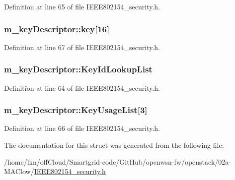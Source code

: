 Definition at line 65 of file I\+E\+E\+E802154\+\_\+security.\+h.

\subsubsection[{\texorpdfstring{key}{key}}]{ m\+\_\+key\+Descriptor\+::key\mbox{[}16\mbox{]}}\hypertarget{structm__key_descriptor_a858158ce9fb438694b20903224536e9c}{}\label{structm__key_descriptor_a858158ce9fb438694b20903224536e9c}


Definition at line 67 of file I\+E\+E\+E802154\+\_\+security.\+h.

\subsubsection[{\texorpdfstring{Key\+Id\+Lookup\+List}{KeyIdLookupList}}]{ m\+\_\+key\+Descriptor\+::\+Key\+Id\+Lookup\+List}\hypertarget{structm__key_descriptor_ad637ea689a0a3d949ee8d5d7a5210ddd}{}\label{structm__key_descriptor_ad637ea689a0a3d949ee8d5d7a5210ddd}


Definition at line 64 of file I\+E\+E\+E802154\+\_\+security.\+h.

\subsubsection[{\texorpdfstring{Key\+Usage\+List}{KeyUsageList}}]{ m\+\_\+key\+Descriptor\+::\+Key\+Usage\+List\mbox{[}3\mbox{]}}\hypertarget{structm__key_descriptor_a94d22454d2ebcd35420695d0aa1053cb}{}\label{structm__key_descriptor_a94d22454d2ebcd35420695d0aa1053cb}


Definition at line 66 of file I\+E\+E\+E802154\+\_\+security.\+h.



The documentation for this struct was generated from the following file\+:\begin{DoxyCompactItemize}
\item 
/home/lkn/off\+Cloud/\+Smartgrid-\/code/\+Git\+Hub/openwsn-\/fw/openstack/02a-\/\+M\+A\+Clow/\hyperlink{_i_e_e_e802154__security_8h}{I\+E\+E\+E802154\+\_\+security.\+h}\end{DoxyCompactItemize}
